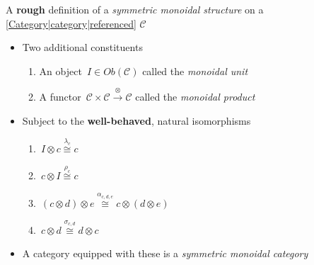 
A \textbf{rough} definition of a \emph{symmetric monoidal structure} on a \ref{Category|category|referenced} $\mathcal{C}$

\begin{itemize}
    \item Two additional constituents
          \begin{enumerate}
            \item An object \,$I \in Ob(\mathcal{C})$ called the \emph{monoidal unit}\,
            \item A functor \,$\mathcal{C}\times \mathcal{C}\xrightarrow{\otimes}\mathcal{C}$ called the \emph{monoidal product}\,
          \end{enumerate}
    \item Subject to the \textbf{well-behaved}, natural isomorphisms
          \begin{enumerate}
            \item \,$I \otimes c \overset{\lambda_c}\cong c$\,
            \item \,$c \otimes I \overset{\rho_c}\cong c$\,
            \item \,$(c \otimes d)\otimes e \overset{\alpha_{c,d,e}}\cong c \otimes (d\otimes e)$\,
            \item \,$c \otimes d \overset{\sigma_{c,d}}\cong d \otimes c$\,
          \end{enumerate}
    \item A category equipped with these is a \emph{symmetric monoidal category}
  \end{itemize}
